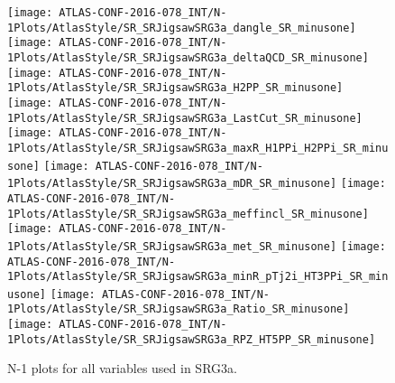 \clearpage
\begin{figure}[tbp]
\begin{center}
\texttt{[image: ATLAS-CONF-2016-078\_INT/N-1Plots/AtlasStyle/SR\_SRJigsawSRG3a\_dangle\_SR\_minusone]}
\texttt{[image: ATLAS-CONF-2016-078\_INT/N-1Plots/AtlasStyle/SR\_SRJigsawSRG3a\_deltaQCD\_SR\_minusone]}
\texttt{[image: ATLAS-CONF-2016-078\_INT/N-1Plots/AtlasStyle/SR\_SRJigsawSRG3a\_H2PP\_SR\_minusone]}
\texttt{[image: ATLAS-CONF-2016-078\_INT/N-1Plots/AtlasStyle/SR\_SRJigsawSRG3a\_LastCut\_SR\_minusone]}
\texttt{[image: ATLAS-CONF-2016-078\_INT/N-1Plots/AtlasStyle/SR\_SRJigsawSRG3a\_maxR\_H1PPi\_H2PPi\_SR\_minusone]}
\texttt{[image: ATLAS-CONF-2016-078\_INT/N-1Plots/AtlasStyle/SR\_SRJigsawSRG3a\_mDR\_SR\_minusone]}
\texttt{[image: ATLAS-CONF-2016-078\_INT/N-1Plots/AtlasStyle/SR\_SRJigsawSRG3a\_meffincl\_SR\_minusone]}
\texttt{[image: ATLAS-CONF-2016-078\_INT/N-1Plots/AtlasStyle/SR\_SRJigsawSRG3a\_met\_SR\_minusone]}
\texttt{[image: ATLAS-CONF-2016-078\_INT/N-1Plots/AtlasStyle/SR\_SRJigsawSRG3a\_minR\_pTj2i\_HT3PPi\_SR\_minusone]}
\texttt{[image: ATLAS-CONF-2016-078\_INT/N-1Plots/AtlasStyle/SR\_SRJigsawSRG3a\_Ratio\_SR\_minusone]}
\texttt{[image: ATLAS-CONF-2016-078\_INT/N-1Plots/AtlasStyle/SR\_SRJigsawSRG3a\_RPZ\_HT5PP\_SR\_minusone]}
\end{center}
\caption{N-1 plots for all variables used in SRG3a.}
\label{fig:SR_SRJigsawSRG2b_met_SR_minusone}
\end{figure}

